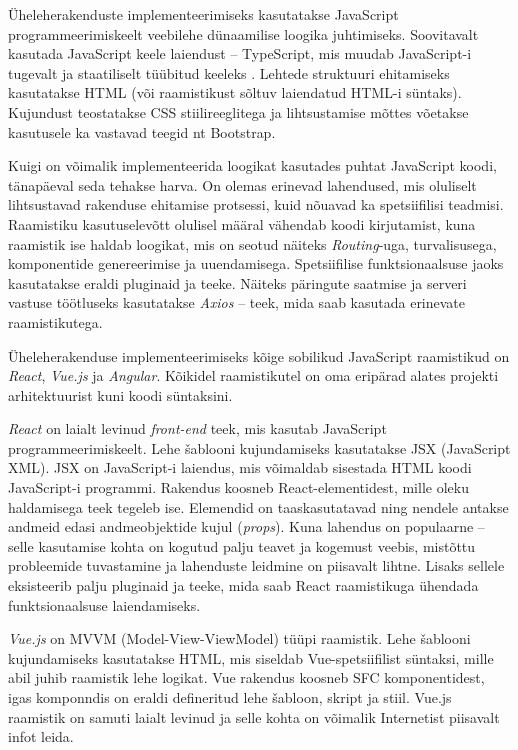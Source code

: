 Üheleherakenduste implementeerimiseks kasutatakse JavaScript programmeerimiskeelt veebilehe dünaamilise 
loogika juhtimiseks. Soovitavalt kasutada JavaScript keele laiendust -- TypeScript, mis muudab JavaScript-i 
tugevalt ja staatiliselt tüübitud keeleks \cite{about_typescript}. Lehtede struktuuri ehitamiseks kasutatakse HTML (või raamistikust
sõltuv laiendatud HTML-i süntaks). Kujundust teostatakse CSS stiilireeglitega ja lihtsustamise mõttes
võetakse kasutusele ka vastavad teegid nt Bootstrap.

Kuigi on võimalik implementeerida loogikat kasutades puhtat JavaScript koodi, tänapäeval seda tehakse
harva. On olemas erinevad lahendused, mis oluliselt lihtsustavad rakenduse ehitamise protsessi, kuid 
nõuavad ka spetsiifilisi teadmisi. Raamistiku kasutuselevõtt olulisel määral vähendab koodi kirjutamist,
kuna raamistik ise haldab loogikat, mis on seotud näiteks \textit{Routing}-uga, turvalisusega, komponentide
genereerimise ja uuendamisega. Spetsiifilise funktsionaalsuse jaoks kasutatakse eraldi pluginaid ja teeke. Näiteks
päringute saatmise ja serveri vastuse töötluseks kasutatakse \textit{Axios} -- teek, mida saab kasutada 
erinevate raamistikutega.

Üheleherakenduse implementeerimiseks kõige sobilikud JavaScript raamistikud on \textit{React}, \textit{Vue.js}
ja \textit{Angular}. Kõikidel raamistikutel on oma eripärad alates projekti arhitektuurist kuni 
koodi süntaksini. 

\textit{React} on laialt levinud \textit{front-end} teek, mis kasutab JavaScript programmeerimiskeelt. 
Lehe šablooni kujundamiseks kasutatakse JSX (JavaScript XML). JSX on JavaScript-i laiendus, mis võimaldab
sisestada HTML koodi JavaScript-i programmi. Rakendus koosneb React-elementidest, mille oleku haldamisega teek
tegeleb ise. Elemendid on taaskasutatavad ning nendele antakse andmeid edasi andmeobjektide kujul (\textit{props}).
Kuna lahendus on populaarne -- selle kasutamise kohta on kogutud palju teavet ja kogemust veebis, mistõttu
probleemide tuvastamine ja lahenduste leidmine on piisavalt lihtne. Lisaks sellele eksisteerib palju pluginaid
ja teeke, mida saab React raamistikuga ühendada funktsionaalsuse laiendamiseks. 

\textit{Vue.js} on MVVM (Model-View-ViewModel) tüüpi raamistik. Lehe šablooni kujundamiseks kasutatakse HTML, 
mis siseldab Vue-spetsiifilist süntaksi, mille abil juhib raamistik lehe logikat. Vue rakendus koosneb SFC 
komponentidest, igas komponndis on eraldi defineritud lehe šabloon, skript ja stiil. Vue.js raamistik on
samuti laialt levinud ja selle kohta on võimalik Internetist piisavalt infot leida.

